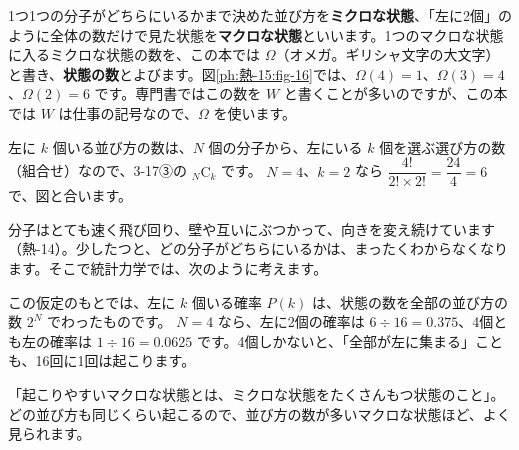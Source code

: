 1つ1つの分子がどちらにいるかまで決めた並び方を\textbf{ミクロな状態}、「左に2個」のように全体の数だけで見た状態を\textbf{マクロな状態}といいます。1つのマクロな状態に入るミクロな状態の数を、この本では $\Omega$（オメガ。ギリシャ文字の大文字）と書き、\textbf{状態の数}とよびます。図\ref{ph:熱-15:fig-16}では、$\Omega(4)=1$、$\Omega(3)=4$、$\Omega(2)=6$ です。専門書ではこの数を $W$ と書くことが多いのですが、この本では $W$ は仕事の記号なので、$\Omega$ を使います。

左に $k$ 個いる並び方の数は、$N$ 個の分子から、左にいる $k$ 個を選ぶ選び方の数（組合せ）なので、3-17③の ${}_N\mathrm{C}_k$ です。
$N=4$、$k=2$ なら $\dfrac{4!}{2!\times2!}=\dfrac{24}{4}=6$ で、図と合います。

分子はとても速く飛び回り、壁や互いにぶつかって、向きを変え続けています（熱-14）。少したつと、どの分子がどちらにいるかは、まったくわからなくなります。そこで統計力学では、次のように考えます。
\begin{phmodel}[等確率の原理]
\end{phmodel}
この仮定のもとでは、左に $k$ 個いる確率 $P(k)$ は、状態の数を全部の並び方の数 $2^N$ でわったものです。
$N=4$ なら、左に2個の確率は $6\div16=0.375$、4個とも左の確率は $1\div16=0.0625$ です。4個しかないと、「全部が左に集まる」ことも、16回に1回は起こります。

\begin{phyomi}[$P(k)=\dfrac{\Omega(k)}{2^N}$]
「起こりやすいマクロな状態とは、ミクロな状態をたくさんもつ状態のこと」。どの並び方も同じくらい起こるので、並び方の数が多いマクロな状態ほど、よく見られます。
\end{phyomi}

